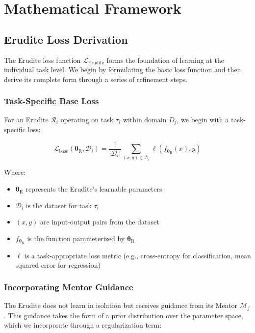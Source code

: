 \chapter{Mathematical Framework}

\section{Erudite Loss Derivation}

The Erudite loss function $\mathcal{L}_{\textrm{Erudite}}$ forms the foundation of learning at the individual task level. We begin by formulating the basic loss function and then derive its complete form through a series of refinement steps.

\subsection{Task-Specific Base Loss}

For an Erudite $\mathcal{R}_i$ operating on task $\tau_i$ within domain $D_j$, we begin with a task-specific loss:

\begin{equation}
\mathcal{L}_{\textrm{base}}(\boldsymbol{\theta}_{\textrm{R}}, \mathcal{D}_i) = \frac{1}{|\mathcal{D}_i|}\sum_{(x,y) \in \mathcal{D}_i} \ell(f_{\boldsymbol{\theta}_{\textrm{R}}}(x), y)
\end{equation}

Where:
\begin{itemize}
    \item $\boldsymbol{\theta}_{\textrm{R}}$ represents the Erudite's learnable parameters
    \item $\mathcal{D}_i$ is the dataset for task $\tau_i$
    \item $(x,y)$ are input-output pairs from the dataset
    \item $f_{\boldsymbol{\theta}_{\textrm{R}}}$ is the function parameterized by $\boldsymbol{\theta}_{\textrm{R}}$
    \item $\ell$ is a task-appropriate loss metric (e.g., cross-entropy for classification, mean squared error for regression)
\end{itemize}

\subsection{Incorporating Mentor Guidance}

The Erudite does not learn in isolation but receives guidance from its Mentor $\mathcal{M}_j$. This guidance takes the form of a prior distribution over the parameter space, which we incorporate through a regularization term:

